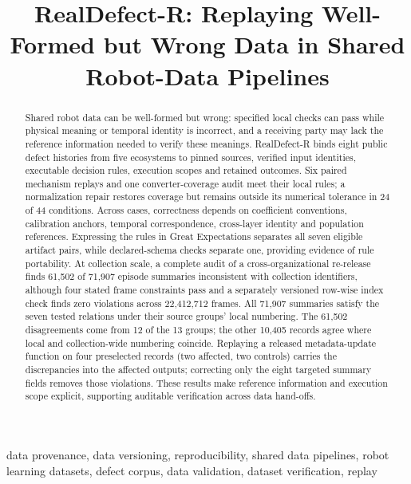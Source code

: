 \documentclass[conference]{IEEEtran}
\begin{document}
\title{\mbox{RealDefect-R}: Replaying Well-Formed but Wrong Data in Shared Robot-Data Pipelines}
\maketitle
\begin{abstract}

Shared robot data can be well-formed but wrong: specified local checks can pass while physical meaning or temporal identity is incorrect, and a receiving party may lack the reference information needed to verify these meanings. \mbox{RealDefect-R} binds eight public defect histories from five ecosystems to pinned sources, verified input identities, executable decision rules, execution scopes and retained outcomes. Six paired mechanism replays and one converter-coverage audit meet their local rules; a normalization repair restores coverage but remains outside its numerical tolerance in 24 of 44 conditions. Across cases, correctness depends on coefficient conventions, calibration anchors, temporal correspondence, cross-layer identity and population references. Expressing the rules in Great Expectations separates all seven eligible artifact pairs, while declared-schema checks separate one, providing evidence of rule portability. At collection scale, a complete audit of a cross-organizational re-release finds 61,502 of 71,907 episode summaries inconsistent with collection identifiers, although four stated frame constraints pass and a separately versioned row-wise index check finds zero violations across 22,412,712 frames. All 71,907 summaries satisfy the seven tested relations under their source groups' local numbering. The 61,502 disagreements come from 12 of the 13 groups; the other 10,405 records agree where local and collection-wide numbering coincide. Replaying a released metadata-update function on four preselected records (two affected, two controls) carries the discrepancies into the affected outputs; correcting only the eight targeted summary fields removes those violations. These results make reference information and execution scope explicit, supporting auditable verification across data hand-offs.\par

\end{abstract}

\begin{IEEEkeywords}
data provenance, data versioning, reproducibility, shared data pipelines, robot learning datasets, defect corpus, data validation, dataset verification, replay
\end{IEEEkeywords}
\end{document}
